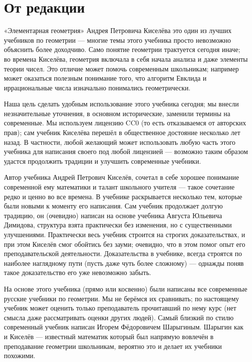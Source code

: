 \section*{От редакции}


«Элементарная геометрия» Андрея Петровича Киселёва это один из лучших учебников по геометрии ---
многие темы этого учебника просто невозможно объяснить более доходчиво.
Само понятие геометрии трактуется сегодня иначе;
во времена Киселёва, геометрия включала в себя начала анализа и даже элементы теории чисел.
Это отличие может помочь современным школьникам;
например может оказаться полезным понимание того, что алгоритм Евклида и иррациональные числа изначально понимались геометрически.

Наша цель сделать удобным использование этого учебника сегодня;
мы внесли незначительные уточнения, в основном исторические, заменили термины на современные. 
Мы используем лицензию CC0 (то есть отказываемся от авторских прав); сам учебник Киселёва перешёл в общественное достояние несколько лет назад.
В частности, любой желающий может использовать любую часть этого учебника для написания своего под любой лицензией ---
возможно таким образом удастся продолжить традиции и улучшить современные учебники. 

Автор учебника Андрей Петрович Киселёв, сочетал в себе хорошее понимание современной ему математики и талант школьного учителя --- такое сочетание редко и ценно во все времена.
В учебнике раскрывается несколько тем, которые были новыми к моменту его написания. 
Сам учебник продолжает долгую традицию, он (очевидно) написан на основе учебника Августа Юльевича Димидова, структура взята практически без изменения, но с существенными улучшениями.
Практически весь учебник строится на строгих доказательствах, и при этом Киселёв смог обойтись без зауми;
очевидно, что в этом помог опыт его преподавательской деятельности.
Доказательства в учебнике, всегда строятся по наиболее наглядному пути (пусть даже чуть более сложному) --- однажды поняв такое доказательство его уже невозможно забыть.

На основе этого учебника (прямо или косвенно) были написаны все современные русские учебники по геометрии.
Мы не берёмся их сравнивать; по настоящему учебник может оценить только преподаватель прочитавший по нему курс (нет смысла даже рассматривать оценки других людей).
Самый близкий по стилю современный учебник написан Игорем Фёдоровичем Шарыгиным.
Шарыгин как и Киселёв --- известный математик который был напрямую вовлечён в преподавание геометрии школьникам, вероятно это и делает их учебники похожими.

\clearpage
